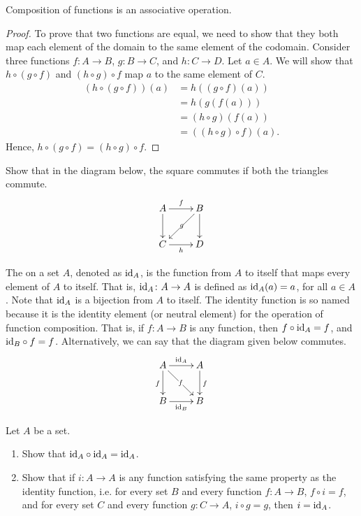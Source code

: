\begin{Theorem}\label{thm:FuncCompAssoc}
Composition of functions is an associative operation.
\end{Theorem}

\begin{proof}
To prove that two functions are equal, we need to show that they both map each element of the domain to the same element of the codomain. Consider three functions $f \colon A \to B$, $g \colon B \to C$, and $h \colon C \to D$. Let $a \in A$. We will show that $h \circ (g \circ f)$ and $(h \circ g) \circ f$ map $a$ to the same element of $C$.
\begin{align*}
(h \circ (g \circ f))(a) & = h((g \circ f)(a)) \\
    & = h(g(f(a))) \\
    & = (h \circ g)(f(a)) \\
    & = ((h \circ g) \circ f)(a).
\end{align*}
Hence, $h \circ (g \circ f) = (h \circ g) \circ f$.
\end{proof}

\begin{Exercise}
Show that in the diagram below, the square commutes if both the triangles commute.
\begin{equation*}
\xymatrix{
A \ar[r]^f \ar[d] & B \ar[dl]|-g \ar[d]\\
C \ar[r]_h & D
}
\end{equation*}
\end{Exercise}

The  on a set $A$, denoted as $\mathrm{id}_A$, is the function from $A$ to itself that maps every element of $A$ to itself. That is, $\mathrm{id}_A \colon A \to A$ is defined as $\mathrm{id}_A(a) = a$, for all $a \in A$. Note that $\mathrm{id}_A$ is a bijection from $A$ to itself. The identity function is so named because it is the identity element (or neutral element) for the operation of function composition. That is, if $f \colon A \to B$ is any function, then $f \circ \mathrm{id}_A = f$, and $\mathrm{id}_B \circ f = f$. Alternatively, we can say that the diagram given below commutes.
\begin{equation*}
\xymatrix{
A \ar[d]_{f} \ar[r]^{\id_A} \ar[dr]|-f & A \ar[d]^{f}\\
B \ar[r]_{\id_B} & B
}
\end{equation*}

\begin{Exercise}
Let $A$ be a set.
\begin{enumerate}
\item Show that $\mathrm{id}_A \circ \mathrm{id}_A = \mathrm{id}_A$.
\item Show that if $i \colon A \to A$ is any function satisfying the same property as the identity function, i.e. for every set $B$ and every function $f \colon A \to B$, $f \circ i = f$, and for every set $C$ and every function $g \colon C \to A$, $i \circ g = g$,  then $i = \mathrm{id}_A$.
\end{enumerate}
\end{Exercise}

